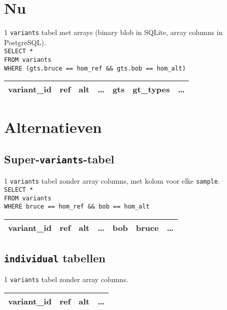 \documentclass{article}
\begin{document}
\section{Nu}

1 \texttt{variants} tabel met arrays (binary blob in SQLite, array columns in PostgreSQL).\\

\texttt{SELECT * \\FROM variants \\WHERE (gts.bruce == hom\_ref \&\& gts.bob == hom\_alt)}
\begin{table}[h]
\begin{tabular}{@{}|l|l|l|l|l|l|l|@{}}
\toprule
variant\_id & ref & alt & \ldots & gts & gt\_types & \ldots \\ \bottomrule
\end{tabular}
\end{table}

\section{Alternatieven}

\subsection{Super-\texttt{variants}-tabel}

1 \texttt{variants} tabel zonder array columns, met kolom voor elke \texttt{sample}.\\

\texttt{SELECT * \\
FROM variants \\
WHERE bruce == hom\_ref \&\& bob == hom\_alt}
\begin{table}[!htbp]
\begin{tabular}{@{}|l|l|l|l|l|l|l|@{}}
\toprule
variant\_id & ref & alt & \ldots & bob & bruce & \ldots \\ \bottomrule
\end{tabular}
\end{table}

\subsection{\texttt{individual} tabellen} 

1 \texttt{variants} tabel zonder array columns.

\begin{table}[!htbp]
\begin{tabular}{@{}|l|l|l|l|@{}}
\toprule
variant\_id & ref & alt & \ldots \\ \bottomrule
\end{tabular}
\end{table}
\end{document}
